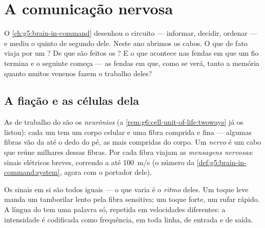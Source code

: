 \chapter{A comunicação nervosa}\label{ch:g8:nervous-communication}

O \cref{ch:g5:brain-in-command} desenhou o circuito --- informar,
decidir, ordenar --- e mediu o quinto de segundo dele. Neste ano
abrimos os cabos. O que de fato viaja por um ? De que são feitos
os ? E o que acontece nas fendas em que um fio termina e o
seguinte começa --- as fendas em que, como se verá, tanto a memória
quanto muitos venenos fazem o trabalho deles?

\section{A fiação e as células dela}

\begin{definition}\label{def:g8:nervous-communication:neuron}
As  de trabalho do  são os
\emph{neurônios} (a
\cref{rem:g6:cell-unit-of-life:twoways} já os listou): cada um tem um
corpo celular e uma fibra comprida e fina --- algumas fibras vão da
 até o dedo do pé, as  mais compridas do corpo. Um
\emph{nervo} é um cabo que reúne milhares dessas fibras.
Por cada fibra viajam as \emph{mensagens nervosas}: sinais elétricos breves, correndo a até \qty{100}{m/s} (o
número da \cref{def:g5:brain-in-command:system}, agora com o portador
dele).
\end{definition}

\begin{proposition}\label{prop:g8:nervous-communication:code}
Os sinais em si são todos iguais --- o que varia é o \emph{ritmo}
deles. Um toque leve manda um tamborilar lento pela fibra sensitiva;
um toque forte, um rufar rápido. A língua do  tem uma
palavra só, repetida em velocidades diferentes: a intensidade é
codificada como frequência, em toda linha, de entrada e de saída.
\end{proposition}
\admitted

